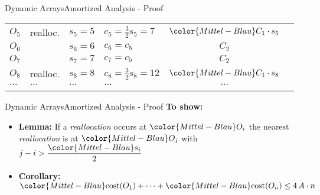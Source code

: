 \begin{frame}{Dynamic Arrays}{Amortized Analysis - Proof}
\begin{table}[!h]
\begin{tabular}{|l|l|l|l|c|@{}l}
      \cmidrule{1-5}
      $O_5$ & {\color{Mittel-Blau}realloc.} &
      $s_5 = 5$ & {\color{Mittel-Blau}$c_5 = \frac{3}{2} s_5 = 7$} &
      ${\color{Mittel-Blau}C_1 \cdot s_5}$ &
      \raisebox{-0.5em}{\multirow{3}{*}{%
        $\left.\begin{array}{@{}l@{}}\\[3.25em]\end{array}\right\rbrace
        \begin{array}{@{}l@{}}
          \text{distance}\\
          3 \geq \left\lfloor\dfrac{{\color{Mittel-Blau}s_5}}{2}\right\rfloor
        \end{array}$%
      }}\\
      $O_6$ & {} & $s_6 = 6$ & $c_6 = c_5$ & $C_2$\\
      $O_7$ & {} & $s_7 = 7$ & $c_7 = c_5$ & $C_2$\\
      \cmidrule{1-5}
      $O_8$ & {\color{Mittel-Blau}realloc.} &
      $s_8 = 8$ & {\color{Mittel-Blau}$c_8 = \frac{3}{2} s_8 = 12$} &
      ${\color{Mittel-Blau}C_1 \cdot s_8}$\\
      $\dots$ & $\dots$ & $\dots$ & $\dots$ & $\dots$\\
      \addlinespace[0.5\aboverulesep]\cmidrule[\heavyrulewidth]{1-5}
    \end{tabular}
  \end{table}
\end{frame}


\begin{frame}{Dynamic Arrays}{Amortized Analysis - Proof}
  \textbf{To show:}
  \begin{itemize}
    \item
      \textbf{Lemma:}
      If a \textit{reallocation} occurs at ${\color{Mittel-Blau}O_i}$
      the nearest \textit{reallocation} is at ${\color{Mittel-Blau}O_j}$
      with $j - i > \dfrac{{\color{Mittel-Blau}s_i}}{2}$
    \item
      \textbf{Corollary:}
      ${\color{Mittel-Blau}\mathrm{cost}(O_1)}+\dots
        +{\color{Mittel-Blau}\mathrm{cost}(O_n)} \leq 4 \, A \cdot n$
  \end{itemize}
\end{frame}


